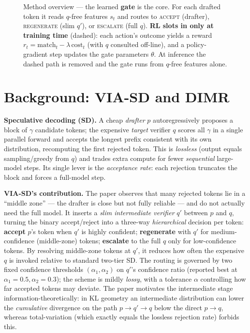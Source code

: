 \documentclass[11pt]{article}
\begin{document}
\begin{figure}[t]
\caption{Method overview --- the learned \textbf{gate} is the core. For each drafted token it reads
$q$-free features $s_t$ and routes to \textsc{accept} (drafter), \textsc{regenerate} (slim $q'$), or
\textsc{escalate} (full $q$). \textbf{RL slots in only at training time} (dashed): each action's
outcome yields a reward $r_t=\text{match}_t-\lambda\,\text{cost}_t$ (with $q$ consulted off-line), and a
policy-gradient step updates the gate parameters $\theta$. At inference the dashed path is removed and
the gate runs from $q$-free features alone.}
\label{fig:flow}
\end{figure}

\section{Background: VIA-SD and DIMR}
\textbf{Speculative decoding (SD).} A cheap \emph{drafter} $p$ autoregressively proposes a block of
$\gamma$ candidate tokens; the expensive \emph{target} verifier $q$ scores all $\gamma$ in a single
parallel forward and accepts the longest prefix consistent with its own distribution, recomputing
the first rejected token. This is \emph{lossless} (output equals sampling/greedy from $q$) and trades
extra compute for fewer \emph{sequential} large-model steps. Its single lever is the
\emph{acceptance rate}: each rejection truncates the block and forces a full-model step.

\textbf{VIA-SD's contribution.} The paper observes that many rejected tokens lie in a ``middle zone''
--- the drafter is close but not fully reliable --- and do not actually need the full model. It
inserts a \emph{slim intermediate verifier} $q'$ between $p$ and $q$, turning the binary
accept/reject into a three-way \emph{hierarchical} decision per token: \textbf{accept} $p$'s token
when $q'$ is highly confident; \textbf{regenerate} with $q'$ for medium-confidence (middle-zone)
tokens; \textbf{escalate} to the full $q$ only for low-confidence tokens. By resolving middle-zone
tokens at $q'$, it reduces how often the expensive $q$ is invoked relative to standard two-tier SD. The routing
is governed by two fixed confidence thresholds $(\alpha_1,\alpha_2)$ on $q'$'s confidence ratio
(reported best at $\alpha_1{=}0.5,\alpha_2{=}0.3$); the scheme is mildly \emph{lossy}, with a
tolerance $\alpha$ controlling how far accepted tokens may deviate. The paper motivates the
intermediate stage information-theoretically: in KL geometry an intermediate distribution can lower
the \emph{cumulative} divergence on the path $p\!\to\!q'\!\to\!q$ below the direct $p\!\to\!q$,
whereas total-variation (which exactly equals the lossless rejection rate) forbids this.
\end{document}
